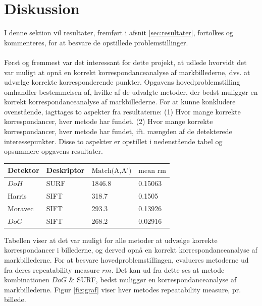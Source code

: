 \chapter{Diskussion}
I denne sektion vil resultater, fremført i afsnit \ref{sec:resultater}, fortolkes og kommenteres, for at besvare de opstillede problemstillinger. \\ \\
Først og fremmest var det interessant for dette projekt, at udlede hvorvidt det var muligt at opnå en korrekt korrespondanceanalyse af markbillederne, dvs. at udvælge korrekte korresponderende punkter. Opgavens hovedproblemstilling omhandler bestemmelsen af, hvilke af de udvalgte metoder, der bedst muliggør en korrekt korrespondanceanalyse af markbillederne. For at kunne konkludere ovenstående, iagttages to aspekter fra resultaterne: (1) Hvor mange korrekte korrespondancer, hver metode har fundet. (2) Hvor mange korrekte korrespondancer, hver metode har fundet, ift. mængden af de detekterede interessepunkter. Disse to aspekter er opstillet i nedenstående tabel og opsummere opgavens resultater.
\begin{center}
    \begin{tabular}{ | l | l | l | l |}
    \hline
    Detektor & Deskriptor & $\text{Match(A,A')}$ & $\text{mean rm}$ \\ \hline
    $DoH$ & SURF & 1846.8 & 0.15063 \\ \hline  
    Harris & SIFT & 318.7 & 0.1505 \\ \hline    
    Moravec & SIFT & 293.3 & 0.13926 \\ \hline    
    $DoG$ & SIFT & 268.2 & 0.02916 \\ \hline         
    \end{tabular}
    \label{table:tab}
\end{center}
Tabellen viser at det var muligt for alle metoder at udvælge korrekte korrespondancer i billederne, og derved opnå en korrekt korrespondanceanalyse af markbillederne. For at besvare hovedproblemstillingen, evalueres metoderne ud fra deres repeatability measure $rm$. Det kan ud fra dette ses at metode kombinationen $DoG$ \& SURF, bedst muliggør en korrespondanceanalyse af markbillederne. Figur \ref{fig:graf} viser hver metodes repeatability measure, pr. billede.
